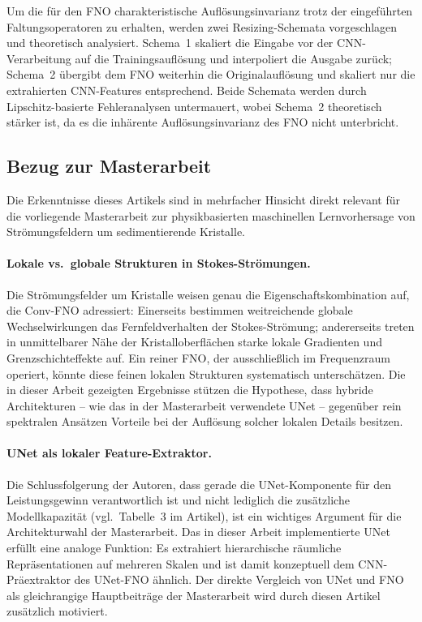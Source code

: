 \documentclass[a4paper,12pt]{article}
\begin{document}
Um die für den FNO charakteristische Auflösungsinvarianz trotz der eingeführten Faltungsoperatoren zu erhalten, werden zwei Resizing-Schemata vorgeschlagen und theoretisch analysiert. Schema~1 skaliert die Eingabe vor der CNN-Verarbeitung auf die Trainingsauflösung und interpoliert die Ausgabe zurück; Schema~2 übergibt dem FNO weiterhin die Originalauflösung und skaliert nur die extrahierten CNN-Features entsprechend. Beide Schemata werden durch Lipschitz-basierte Fehleranalysen untermauert, wobei Schema~2 theoretisch stärker ist, da es die inhärente Auflösungsinvarianz des FNO nicht unterbricht.

\subsection*{Bezug zur Masterarbeit}

Die Erkenntnisse dieses Artikels sind in mehrfacher Hinsicht direkt relevant für die vorliegende Masterarbeit zur physikbasierten maschinellen Lernvorhersage von Strömungsfeldern um sedimentierende Kristalle.

\paragraph{Lokale vs.\ globale Strukturen in Stokes-Strömungen.} Die Strömungsfelder um Kristalle weisen genau die Eigenschaftskombination auf, die Conv-FNO adressiert: Einerseits bestimmen weitreichende globale Wechselwirkungen das Fernfeldverhalten der Stokes-Strömung; andererseits treten in unmittelbarer Nähe der Kristalloberflächen starke lokale Gradienten und Grenzschichteffekte auf. Ein reiner FNO, der ausschließlich im Frequenzraum operiert, könnte diese feinen lokalen Strukturen systematisch unterschätzen. Die in dieser Arbeit gezeigten Ergebnisse stützen die Hypothese, dass hybride Architekturen -- wie das in der Masterarbeit verwendete UNet -- gegenüber rein spektralen Ansätzen Vorteile bei der Auflösung solcher lokalen Details besitzen.

\paragraph{UNet als lokaler Feature-Extraktor.} Die Schlussfolgerung der Autoren, dass gerade die UNet-Komponente für den Leistungsgewinn verantwortlich ist und nicht lediglich die zusätzliche Modellkapazität (vgl.\ Tabelle~3 im Artikel), ist ein wichtiges Argument für die Architekturwahl der Masterarbeit. Das in dieser Arbeit implementierte UNet erfüllt eine analoge Funktion: Es extrahiert hierarchische räumliche Repräsentationen auf mehreren Skalen und ist damit konzeptuell dem CNN-Präextraktor des UNet-FNO ähnlich. Der direkte Vergleich von UNet und FNO als gleichrangige Hauptbeiträge der Masterarbeit wird durch diesen Artikel zusätzlich motiviert.
\end{document}
